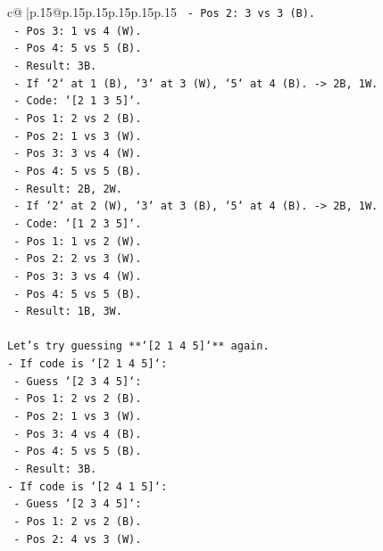\documentclass{article}
\begin{document}
{\begin{supertabular}{c@{$\;$}|p{.15\linewidth}@{}p{.15\linewidth}p{.15\linewidth}p{.15\linewidth}p{.15\linewidth}p{.15\linewidth}}
{{{\texttt{        {-} Pos 2: 3 vs 3 (B).} \\
\texttt{        {-} Pos 3: 1 vs 4 (W).} \\
\texttt{        {-} Pos 4: 5 vs 5 (B).} \\
\texttt{        {-} Result: 3B.} \\
\texttt{    {-} If `2` at 1 (B), `3` at 3 (W), `5` at 4 (B). {-}> 2B, 1W.} \\
\texttt{    {-} Code: `{[}2 1 3 5{]}`.} \\
\texttt{        {-} Pos 1: 2 vs 2 (B).} \\
\texttt{        {-} Pos 2: 1 vs 3 (W).} \\
\texttt{        {-} Pos 3: 3 vs 4 (W).} \\
\texttt{        {-} Pos 4: 5 vs 5 (B).} \\
\texttt{        {-} Result: 2B, 2W.} \\
\texttt{    {-} If `2` at 2 (W), `3` at 3 (B), `5` at 4 (B). {-}> 2B, 1W.} \\
\texttt{    {-} Code: `{[}1 2 3 5{]}`.} \\
\texttt{        {-} Pos 1: 1 vs 2 (W).} \\
\texttt{        {-} Pos 2: 2 vs 3 (W).} \\
\texttt{        {-} Pos 3: 3 vs 4 (W).} \\
\texttt{        {-} Pos 4: 5 vs 5 (B).} \\
\texttt{        {-} Result: 1B, 3W.} \\
\\ 
\texttt{Let's try guessing **`{[}2 1 4 5{]}`** again.} \\
\texttt{{-} If code is `{[}2 1 4 5{]}`:} \\
\texttt{    {-} Guess `{[}2 3 4 5{]}`:} \\
\texttt{        {-} Pos 1: 2 vs 2 (B).} \\
\texttt{        {-} Pos 2: 1 vs 3 (W).} \\
\texttt{        {-} Pos 3: 4 vs 4 (B).} \\
\texttt{        {-} Pos 4: 5 vs 5 (B).} \\
\texttt{        {-} Result: 3B.} \\
\texttt{{-} If code is `{[}2 4 1 5{]}`:} \\
\texttt{    {-} Guess `{[}2 3 4 5{]}`:} \\
\texttt{        {-} Pos 1: 2 vs 2 (B).} \\
\texttt{        {-} Pos 2: 4 vs 3 (W).} \\
}}}
\end{supertabular}}
\end{document}
